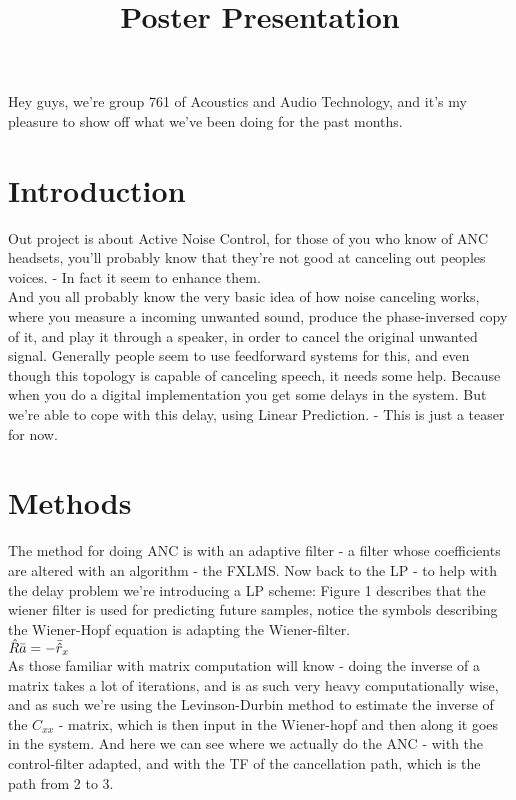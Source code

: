 \documentclass[12pt,a4paper,openright]{article}
\begin{document}
\title{Poster Presentation}

Hey guys, we're group 761 of Acoustics and Audio Technology, and it's my pleasure to show off what we've been doing for the past months.

\section{Introduction}	
Out project is about Active Noise Control, for those of you who know of ANC headsets, you'll probably know that they're not good at canceling out peoples voices.
 - In fact it seem to enhance them.\\
And you all probably know the very basic idea of how noise canceling works, where you measure a incoming unwanted sound, produce the phase-inversed copy of it, and play it through a speaker, in order to cancel the original unwanted signal.
Generally people seem to use feedforward systems for this, and even though this topology is capable of canceling speech, it needs some help. Because when you do a digital implementation you get some delays in the system. But we're able to cope with this delay, using Linear Prediction. - This is just a teaser for now.

\section{Methods}	
The method for doing ANC is with an adaptive filter - a filter whose coefficients are altered with an algorithm - the FXLMS.
Now back to the LP - to help with the delay problem we're introducing a LP scheme:
Figure 1 describes that the wiener filter is used for predicting future samples, notice the symbols describing the Wiener-Hopf equation is adapting the Wiener-filter.\\
$\Hat{R}\bar{a} = -\bar{\hat{r}}_x$ \\
As those familiar with matrix computation will know - doing the inverse of a matrix takes a lot of iterations, and is as such very heavy computationally wise, and as such we're using the Levinson-Durbin method to estimate the inverse of the $C_{xx}$ - matrix, which is then input in the Wiener-hopf and then along it goes in the system.
And here we can see where we actually do the ANC - with the control-filter adapted, and with the TF of the cancellation path, which is the path from 2 to 3.
	
\end{document}
